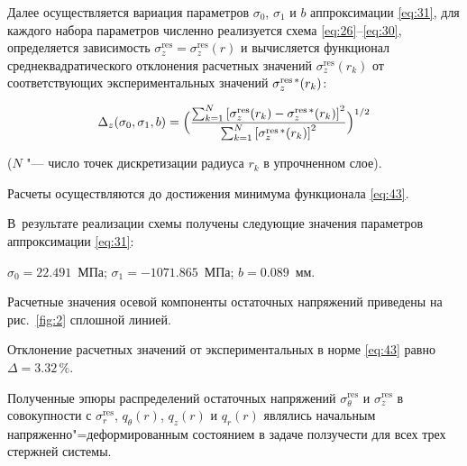 Далее осуществляется вариация параметров $\sigma_0$, $\sigma_1$ и $b$ аппроксимации \eqref{eq:31}, для каждого набора параметров численно реализуется схема \eqref{eq:26}--\eqref{eq:30}, определяется зависимость $\sigma_z^{\text{res}} = \sigma_z^{\text{res}} (r)$ и вычисляется функционал среднеквадратического отклонения расчетных значений $\sigma_z^{\text{res}} (r_k)$ от соответствующих экспериментальных значений $\sigma_z^{\text{res\,$\ast$}} (r_k)$:

\begin{equation}

\label{eq:43}

\Delta_z (\sigma_0, \sigma_1, b) = \Bigl( 

\frac{

\sum _{k=1}^{N} \left[ \sigma_z^{\text{res}}(r_k) - \sigma_z^{\text{res\,$\ast$}} (r_k)\right]^2 } 

{\sum _{k=1}^{N} \left[ \sigma_z^{\text{res\,$\ast$}} (r_k) \right]^2}

\Bigr)^{1/2} 

\end{equation}

($N$ "--- число точек дискретизации радиуса $r_k$ в упрочненном слое).



Расчеты осуществляются до достижения минимума функционала \eqref{eq:43}.

В~результате реализации схемы получены следующие значения параметров аппроксимации \eqref{eq:31}:

$\sigma_0 = 22.491$~МПа; $\sigma_1 = -1071.865$~МПа; $b=0.089$~мм.

Расчетные значения осевой компоненты остаточных напряжений приведены на рис.~\ref{fig:2} сплошной линией.

Отклонение расчетных значений от экспериментальных в норме \eqref{eq:43} равно $\Delta = 3.32\,\%$.

Полученные эпюры распределений остаточных напряжений $\sigma_\theta^{\text{res}}$ и $\sigma_z^{\text{res}}$ в совокупности с $\sigma_r^{\text{res}}$, $q_\theta (r)$, $q_z (r)$ и $q_r (r)$ являлись начальным напряженно"=деформированным состоянием в задаче ползучести для всех трех стержней системы.




